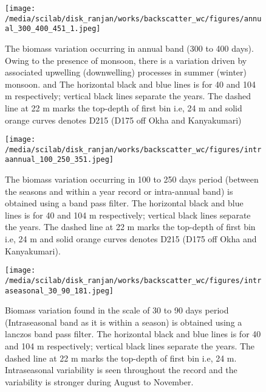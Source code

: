 \documentclass{article}
\begin{document}
\begin{figure}[htbp]
	\centering
	\texttt{[image: /media/scilab/disk\_ranjan/works/backscatter\_wc/figures/annual\_300\_400\_451\_1.jpeg]} 
	\captionsetup{justification=justified,font=footnotesize,skip=0.05\baselineskip,width=\textwidth}
	\caption{The biomass variation occurring in annual band (300 to 400 days). Owing to the presence of monsoon, there is a variation driven by associated upwelling (downwelling) processes in summer (winter) monsoon. and The horizontal black and blue lines is for 40 and 104 m respectively; vertical black lines separate the years. The dashed line at 22 m marks the top-depth of first bin i.e, 24 m and solid orange curves denotes D215 (D175 off Okha and Kanyakumari)}
	\label{fig:annual}
\end{figure}



\begin{figure}[htbp]
	\centering
	\texttt{[image: /media/scilab/disk\_ranjan/works/backscatter\_wc/figures/intraannual\_100\_250\_351.jpeg]} 
	\captionsetup{justification=justified,font=footnotesize,skip=0.05\baselineskip,width=\textwidth}
	\caption{The biomass variation occurring in 100 to 250 days period (between the seasons and within a year record or intra-annual band) is obtained using a band pass filter. The horizontal black and blue lines is for 40 and 104 m respectively; vertical black lines separate the years. The dashed line at 22 m marks the top-depth of first bin i.e, 24 m and solid orange curves denotes D215 (D175 off Okha and Kanyakumari). }
	\label{fig:intraannual}
\end{figure}

\begin{figure}[htbp]
	\centering
	\texttt{[image: /media/scilab/disk\_ranjan/works/backscatter\_wc/figures/intraseasonal\_30\_90\_181.jpeg]} 
	\captionsetup{justification=justified,font=footnotesize,skip=0.05\baselineskip,width=\textwidth}
	\caption{Biomass variation found in the scale of 30 to 90 days  period (Intraseasonal band as it is within a season) is obtained using a lanczos band pass filter. The horizontal black and blue lines is for 40 and 104 m respectively; vertical black lines separate the years. The dashed line at 22 m marks the top-depth of first bin i.e, 24 m.  Intraseasonal variability is seen throughout the record and the variability is stronger during August to November.}
	\label{fig:intraseasonal}
\end{figure}
\end{document}
